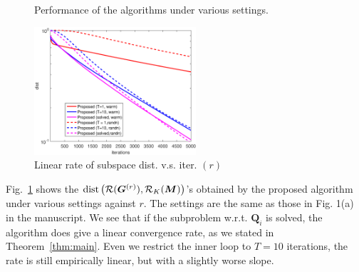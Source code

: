 \documentclass[10pt,journal]{IEEEtran}
\begin{document}
\begin{figure}[ht]
\centering
{}
\caption{Performance of the algorithms under various settings.}
\end{figure}

\begin{figure}[ht]
\centering

\includegraphics[width=6cm]{dist_lambda_1.eps}

\caption{Linear rate of subspace dist. v.s. iter. $(r)$}\label{fig:subfigure2}
\end{figure}

Fig.~\ref{fig:subfigure2} shows the ${\rm dist}\left({\cal R}({\bm G}^{(r)}),{\cal R}_K({\bm M})\right)$'s obtained by the proposed algorithm under various settings against $r$.
The settings are the same as those in Fig. 1(a) in the manuscript.
We see that if the subproblem w.r.t. ${\bm Q}_i$ is solved, the algorithm does give a linear convergence rate, as we stated in Theorem~\ref{thm:main}. Even we restrict the inner loop to $T=10$ iterations, the rate is still empirically linear, but with a slightly worse slope.
\end{document}
